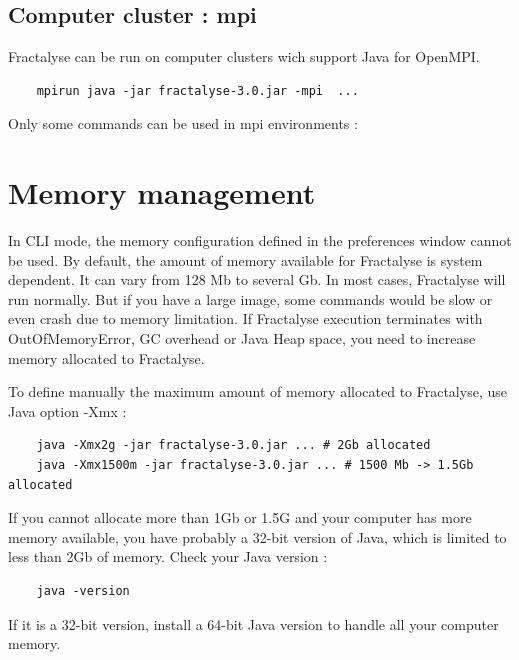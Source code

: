 \documentclass[a4paper,10pt]{report}
\begin{document}
\subsection{Computer cluster : mpi}
Fractalyse can be run on computer clusters wich support Java for OpenMPI.
\begin{Verbatim}
	mpirun java -jar fractalyse-3.0.jar -mpi  ...
\end{Verbatim}
Only some commands can be used in mpi environments : 
\section{Memory management}
In CLI mode, the memory configuration defined in the preferences window cannot be used.
By default, the amount of memory available for Fractalyse is system dependent. It can vary from 128 Mb to several Gb.
In most cases, Fractalyse will run normally. But if you have a large image, some commands would be slow or even crash due to memory limitation.
If Fractalyse execution terminates with OutOfMemoryError, GC overhead or Java Heap space, you need to increase memory allocated to Fractalyse.

To define manually the maximum amount of memory allocated to Fractalyse, use Java option -Xmx :
\begin{Verbatim}
	java -Xmx2g -jar fractalyse-3.0.jar ... # 2Gb allocated
	java -Xmx1500m -jar fractalyse-3.0.jar ... # 1500 Mb -> 1.5Gb allocated
\end{Verbatim}
If you cannot allocate more than 1Gb or 1.5G and your computer has more memory available, you have probably a 32-bit version of Java, which is limited to less than 2Gb of memory.
Check your Java version :
\begin{Verbatim}
	java -version
\end{Verbatim}
If it is a 32-bit version, install a 64-bit Java version to handle all your computer memory.
\end{document}
